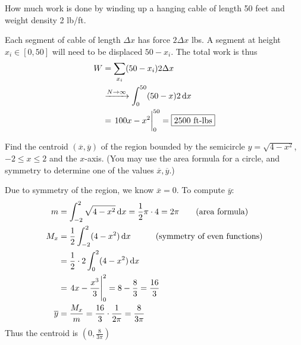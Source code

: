 \documentclass[12pt,answers]{exam}
\begin{document}
\begin{questions}

\newpage
\question[10]
How much work is done by winding up a hanging cable of length 50 feet and weight density 2 lb/ft.
\begin{solution}
Each segment of cable of length $\Delta x$ has force $2\Delta x$ lbs. A segment at height $x_i \in [0, 50]$ will need to be displaced $50-x_i$. The total work is thus 
\begin{align*}
	W &= \sum_{x_i} (50 - x_i) 2 \Delta x \\
	&\xrightarrow{N \to \infty}
	\int_0^{50} (50-x) 2 \dif x \\
	&= \eval{100x - x^2}_0^{50} 
	= \boxed{2500 \text{ ft-lbs}}
\end{align*}
\end{solution}
\question[10]
Find the centroid $(\overline x, \overline y)$ of the region bounded by the semicircle $y = \sqrt{4-x^2}$, $-2 \le x \le 2$ and the $x$-axis. 
(You may use the area formula for a circle, and symmetry to determine one of the values $\overline x, \overline y$.)
\begin{solution}
	Due to symmetry of the region, we know $\overline{x} = 0$.
	To compute $\overline y$: 
	\begin{align*}
		m &= \int_{-2}^2 \sqrt{4-x^2} \dif x = \frac12 \pi \cdot 4 = 2\pi \qquad \text{(area formula)}\\ 
		M_x &= \frac 12 \int_{-2}^2 (4 - x^2) \dif x \qquad\quad \text{(symmetry of even functions)}\\
		&= \frac 12 \cdot 2 \int_0^2 (4-x^2) \dif x \\ 
		&= \eval{4x-\frac{x^3}{3}}_0^2 = 8 - \frac 83 = \frac{16}{3}
		\\
		\overline y &= \frac{M_x}{m} = \frac{16}{3} \cdot \frac{1}{2\pi} = \frac{8}{3\pi}
	\end{align*}
	Thus the centroid is $\boxed{(0, \tfrac{8}{3\pi})}$
\end{solution}
\end{questions}
\end{document}
